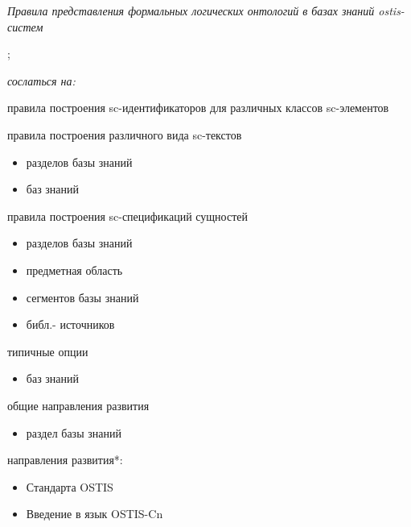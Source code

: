 \begin{SCn}
{{\begin{scnitemize}
			\item\textit{Правила представления формальных логических онтологий в базах знаний ostis-систем}
		\end{scnitemize}};
	}
\textit{сослаться на:}
\begin{scnitemize}
	\item правила построения sc-идентификаторов для различных классов sc-элементов
	\item правила построения различного вида sc-текстов
	\begin{itemize}
		\item разделов базы знаний
		\item баз знаний	
	\end{itemize}	
\end{scnitemize}
\begin{scnitemize}
	\item правила построения sc-спецификаций сущностей
	\begin{itemize}
		\item разделов базы знаний
		\item предметная область
		\item сегментов базы знаний
		\item библ.- источников	
	\end{itemize}	
\end{scnitemize}
\begin{scnitemize}
	\item типичные опции
	\begin{itemize}
		\item баз знаний	
	\end{itemize}	
\end{scnitemize}
\begin{scnitemize}
	\item общие направления развития
	\begin{itemize}
		\item раздел базы знаний	
	\end{itemize}	
\end{scnitemize}
\begin{scnitemize}
	\item направления развития*:
	\begin{itemize}
		\item Стандарта OSTIS
		\item Введение в язык OSTIS-Cn	

\end{itemize}
\end{scnitemize}
\end{SCn}
